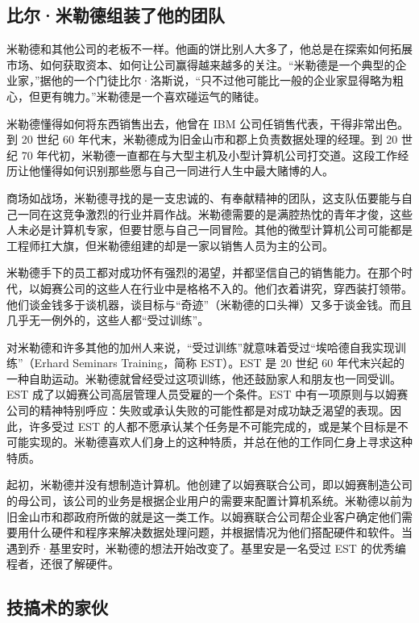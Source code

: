 \documentclass[12pt,UTF8]{ctexbook}
\begin{document}
\subsection{比尔·米勒德组装了他的团队}


米勒德和其他公司的老板不一样。他画的饼比别人大多了，他总是在探索如何拓展市场、如何获取资本、如何让公司赢得越来越多的关注。“米勒德是一个典型的企业家，”据他的一个门徒比尔·洛斯说，“只不过他可能比一般的企业家显得略为粗心，但更有魄力。”米勒德是一个喜欢碰运气的赌徒。

米勒德懂得如何将东西销售出去，他曾在 IBM 公司任销售代表，干得非常出色。到 20 世纪 60 年代末，米勒德成为旧金山市和郡上负责数据处理的经理。到 20 世纪 70 年代初，米勒德一直都在与大型主机及小型计算机公司打交道。这段工作经历让他懂得如何识别那些愿与自己一同进行人生中最大赌博的人。

商场如战场，米勒德寻找的是一支忠诚的、有奉献精神的团队，这支队伍要能与自己一同在这竞争激烈的行业并肩作战。米勒德需要的是满腔热忱的青年才俊，这些人未必是计算机专家，但要甘愿与自己一同冒险。其他的微型计算机公司可能都是工程师扛大旗，但米勒德组建的却是一家以销售人员为主的公司。

米勒德手下的员工都对成功怀有强烈的渴望，并都坚信自己的销售能力。在那个时代，以姆赛公司的这些人在行业中是格格不入的。他们衣着讲究，穿西装打领带。他们谈金钱多于谈机器，谈目标与“奇迹”（米勒德的口头禅）又多于谈金钱。而且几乎无一例外的，这些人都“受过训练”。

对米勒德和许多其他的加州人来说，“受过训练”就意味着受过“埃哈德自我实现训练”（Erhard Seminars Training，简称 EST）。EST 是 20 世纪 60 年代末兴起的一种自助运动。米勒德就曾经受过这项训练，他还鼓励家人和朋友也一同受训。EST 成了以姆赛公司高层管理人员受雇的一个条件。EST 中有一项原则与以姆赛公司的精神特别呼应：失败或承认失败的可能性都是对成功缺乏渴望的表现。因此，许多受过 EST 的人都不愿承认某个任务是不可能完成的，或是某个目标是不可能实现的。米勒德喜欢人们身上的这种特质，并总在他的工作同仁身上寻求这种特质。

起初，米勒德并没有想制造计算机。他创建了以姆赛联合公司，即以姆赛制造公司的母公司，该公司的业务是根据企业用户的需要来配置计算机系统。米勒德以前为旧金山市和郡政府所做的就是这一类工作。以姆赛联合公司帮企业客户确定他们需要用什么硬件和程序来解决数据处理问题，并根据情况为他们搭配硬件和软件。当遇到乔·基里安时，米勒德的想法开始改变了。基里安是一名受过 EST 的优秀编程者，还很了解硬件。





\subsection{技搞术的家伙}
\end{document}
